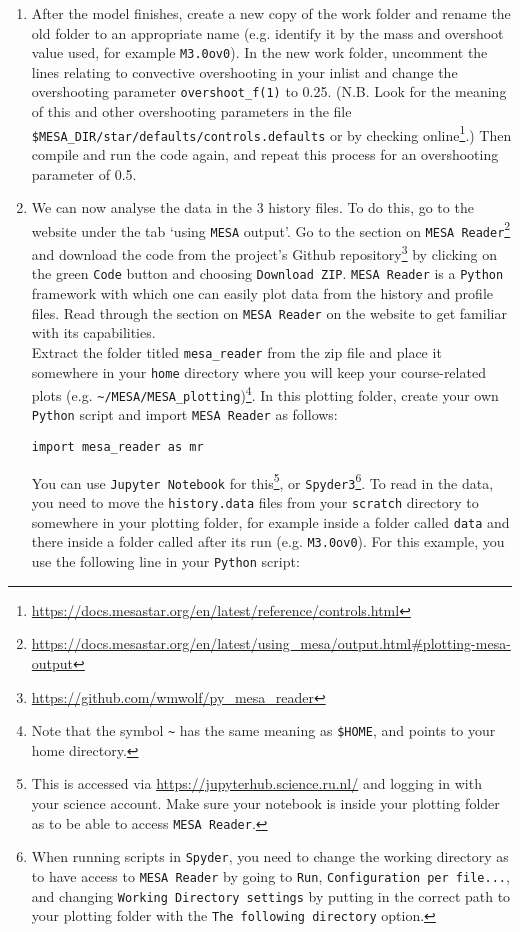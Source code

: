 \documentclass[11pt,a4paper]{article}
\begin{document}
\begin{enumerate}
\item After the model finishes, create a new copy of the work folder and rename the old folder to an appropriate name (e.g. identify it by the mass and overshoot value used, for example \verb|M3.0ov0|). In the new work folder, uncomment the lines relating to convective overshooting in your inlist and change the overshooting parameter \verb|overshoot_f(1)| to 0.25. (N.B. Look for the meaning of this and other overshooting parameters in the file \verb|$MESA_DIR/star/defaults/controls.defaults| or by checking online\footnote{\url{https://docs.mesastar.org/en/latest/reference/controls.html}}.) Then compile and run the code again, and repeat this process for an overshooting parameter of 0.5.
\item We can now analyse the data in the 3 history files. To do this, go to the website under the tab `using \texttt{MESA} output'. Go to the section on \texttt{MESA Reader}\footnote{\url{https://docs.mesastar.org/en/latest/using_mesa/output.html\#plotting-mesa-output}} and download the code from the project's Github repository\footnote{\url{https://github.com/wmwolf/py_mesa_reader}} by clicking on the green \texttt{Code} button and choosing \texttt{Download ZIP}. \texttt{MESA Reader} is a \texttt{Python} framework with which one can easily plot data from the history and profile files. Read through the section on \texttt{MESA Reader} on the website to get familiar with its capabilities. \\[1ex]
Extract the folder titled \texttt{mesa\_reader} from the zip file and place it somewhere in your \texttt{home} directory where you will keep your course-related plots (e.g. \verb|~/MESA/MESA_plotting|)\footnote{Note that the symbol \texttt{\~} has the same meaning as \texttt{\$HOME}, and points to your home directory.}. In this plotting folder, create your own \texttt{Python} script and import \texttt{MESA Reader} as follows:
\begin{verbatim}
import mesa_reader as mr
\end{verbatim}
You can use \texttt{Jupyter Notebook} for this\footnote{This is accessed via \url{https://jupyterhub.science.ru.nl/} and logging in with your science account. Make sure your notebook is inside your plotting folder as to be able to access \texttt{MESA Reader}.}, or \texttt{Spyder3}\footnote{When running scripts in \texttt{Spyder}, you need to change the working directory as to have access to \texttt{MESA Reader} by going to \texttt{Run}, \texttt{Configuration per file...}, and changing \texttt{Working Directory settings} by putting in the correct path to your plotting folder with the \texttt{The following directory} option.}. To read in the data, you need to move the \texttt{history.data} files from your \texttt{scratch} directory to somewhere in your plotting folder, for example inside a folder called \texttt{data} and there inside a folder called after its run (e.g. \texttt{M3.0ov0}). For this example, you use the following line in your \texttt{Python} script:

\end{enumerate}
\end{document}
